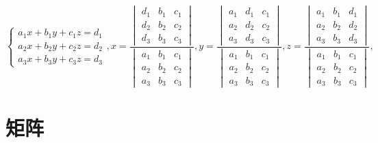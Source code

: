 \documentclass[lang=cn,10pt]{elegantbook}
\begin{document}
\begin{theorem}[三阶克莱默法则] \label{thm:sjklmfz} 
\begin{equation}
   \label{eq:sjklmfz}
   \left \{
   \begin{aligned}
       a_1x+b_1y+c_1z =d_1\\
       a_2x+b_2y+c_2z =d_2\\
       a_3x+b_3y+c_3z =d_3
   \end{aligned}
   \right.,
   x = \frac{\begin{vmatrix}
       d_1&b_1&c_1\\
       d_2&b_2&c_2\\
       d_3&b_3&c_3
   \end{vmatrix}}{\begin{vmatrix}
       a_1&b_1&c_1\\
       a_2&b_2&c_2\\
       a_3&b_3&c_3
   \end{vmatrix}},
  y = \frac{\begin{vmatrix}
       a_1&d_1&c_1\\
       a_2&d_2&c_2\\
       a_3&d_3&c_3
   \end{vmatrix}}{\begin{vmatrix}
       a_1&b_1&c_1\\
       a_2&b_2&c_2\\
       a_3&b_3&c_3
   \end{vmatrix}},
   z = \frac{\begin{vmatrix}
       a_1&b_1&d_1\\
       a_2&b_2&d_2\\
       a_3&b_3&d_3
   \end{vmatrix}}{\begin{vmatrix}
       a_1&b_1&c_1\\
       a_2&b_2&c_2\\
       a_3&b_3&c_3
   \end{vmatrix}},
\end{equation}
\end{theorem}


\chapter{矩阵}
\end{document}

